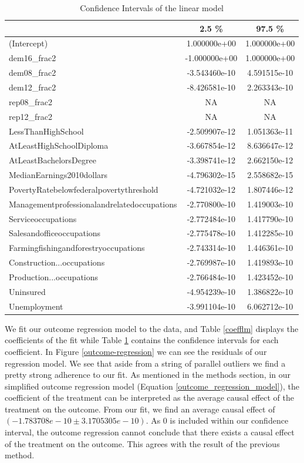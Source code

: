 \documentclass[11pt, conference,compsoc]{IEEEtran}
\begin{document}
\begin{table}
\begin{center}
\caption{Confidence Intervals of the linear model}
\label{conflm}
\begin{tabularx}{.7\textwidth}{ |X|c|c|}
\hline
 &2.5 \%& 97.5 \% \\ \hline
(Intercept)&1.000000e+00 &1.000000e+00 \\ \hline 
dem16\_frac2&-1.000000e+00 & 1.000000e+00 \\ \hline 
dem08\_frac2 &-3.543460e-10 & 4.591515e-10 \\ \hline 
dem12\_frac2 & -8.426581e-10 & 2.263343e-10 \\ \hline 
rep08\_frac2 &NA &           NA \\ \hline 
rep12\_frac2&NA &           NA \\ \hline 
LessThanHighSchool &-2.509907e-12 & 1.051363e-11 \\ \hline 
AtLeastHighSchoolDiploma &-3.667854e-12 & 8.636647e-12 \\ \hline 
AtLeastBachelorsDegree &-3.398741e-12 & 2.662150e-12 \\ \hline 
MedianEarnings2010dollars &-4.796302e-15 & 2.558682e-15 \\ \hline 
PovertyRatebelowfederalpovertythreshold& -4.721032e-12 & 1.807446e-12 \\ \hline 
Managementprofessionalandrelatedoccupations &-2.770800e-10 & 1.419003e-10 \\ \hline 
Serviceoccupations  &-2.772484e-10 & 1.417790e-10 \\ \hline 
Salesandofficeoccupations    &-2.775478e-10 & 1.412285e-10 \\ \hline 
Farmingfishingandforestryoccupations  & -2.743314e-10 & 1.446361e-10 \\ \hline 
Construction...occupations&-2.769987e-10 & 1.419893e-10 \\ \hline 
Production...occupations &-2.766484e-10 & 1.423452e-10 \\ \hline 
Uninsured    &-4.954239e-10 & 1.386822e-10 \\ \hline 
Unemployment   &-3.991104e-10 & 6.062712e-10 \\ \hline 
\end{tabularx}
\end{center}
\end{table}
We fit our outcome regression model to the data, and Table \ref{coefflm} displays the coefficients of the fit while Table \ref{conflm} contains the confidence intervals for each coefficient. In Figure \ref{outcome-regression} we can see the residuals of our regression model. We see that aside from a string of parallel outliers we find a pretty strong adherence to our fit. As mentioned in the methods section, in our simplified outcome regression model (Equation \ref{outcome_regression_model}), the coefficient of the treatment can be interpreted as the average causal effect of the treatment on the outcome. From our fit, we find an average causal effect of  $(-1.783708e-10\pm3.1705305e-10)$. As $0$ is included within our confidence interval, the outcome regression cannot conclude that there exists a causal effect of the treatment on the outcome. This agrees with the result of the previous method.
\end{document}
